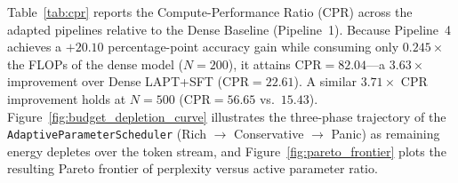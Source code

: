 \documentclass{interact}
\begin{document}
Table~\ref{tab:cpr} reports the Compute-Performance Ratio ($\text{CPR}$) across the adapted pipelines relative to the Dense Baseline (Pipeline~1). Because Pipeline~4 achieves a $+20.10$ percentage-point accuracy gain while consuming only $0.245\times$ the FLOPs of the dense model ($N=200$), it attains $\text{CPR} = 82.04$---a $3.63\times$ improvement over Dense LAPT+SFT ($\text{CPR} = 22.61$). A similar $3.71\times$ CPR improvement holds at $N=500$ ($\text{CPR} = 56.65$ vs.\ $15.43$). Figure~\ref{fig:budget_depletion_curve} illustrates the three-phase trajectory of the \texttt{AdaptiveParameterScheduler} (Rich $\to$ Conservative $\to$ Panic) as remaining energy depletes over the token stream, and Figure~\ref{fig:pareto_frontier} plots the resulting Pareto frontier of perplexity versus active parameter ratio.

\begin{table}[htbp]
    {}
    \label{tab:cpr}
\end{table}
\end{document}
